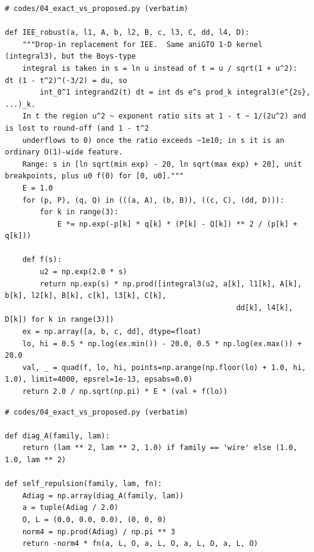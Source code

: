 \documentclass[11pt]{article}
\begin{document}
\begin{lstlisting}[caption={\textbf{Proposed}: the same integral in $s=\ln u$ with range, breakpoints and the
  analytic small-$u$ piece (eqs~\ref{n:logvar}--\ref{n:final}).},label=n:code:robust]
# codes/04_exact_vs_proposed.py (verbatim)

def IEE_robust(a, l1, A, b, l2, B, c, l3, C, dd, l4, D):
    """Drop-in replacement for IEE.  Same aniGTO 1-D kernel (integral3), but the Boys-type
    integral is taken in s = ln u instead of t = u / sqrt(1 + u^2):  dt (1 - t^2)^(-3/2) = du, so
        int_0^1 integrand2(t) dt = int ds e^s prod_k integral3(e^{2s}, ...)_k.
    In t the region u^2 ~ exponent ratio sits at 1 - t ~ 1/(2u^2) and is lost to round-off (and 1 - t^2
    underflows to 0) once the ratio exceeds ~1e10; in s it is an ordinary O(1)-wide feature.
    Range: s in [ln sqrt(min exp) - 20, ln sqrt(max exp) + 20], unit breakpoints, plus u0 f(0) for [0, u0]."""
    E = 1.0
    for (p, P), (q, Q) in (((a, A), (b, B)), ((c, C), (dd, D))):
        for k in range(3):
            E *= np.exp(-p[k] * q[k] * (P[k] - Q[k]) ** 2 / (p[k] + q[k]))

    def f(s):
        u2 = np.exp(2.0 * s)
        return np.exp(s) * np.prod([integral3(u2, a[k], l1[k], A[k], b[k], l2[k], B[k], c[k], l3[k], C[k],
                                                     dd[k], l4[k], D[k]) for k in range(3)])
    ex = np.array([a, b, c, dd], dtype=float)
    lo, hi = 0.5 * np.log(ex.min()) - 20.0, 0.5 * np.log(ex.max()) + 20.0
    val, _ = quad(f, lo, hi, points=np.arange(np.floor(lo) + 1.0, hi, 1.0), limit=4000, epsrel=1e-13, epsabs=0.0)
    return 2.0 / np.sqrt(np.pi) * E * (val + f(lo))
\end{lstlisting}

\begin{lstlisting}[caption={Exact test: $E_x=-(\phi\phi|\phi\phi)$ of the wire and sheet (eqs~\ref{n:ex} and
  \ref{n:self}); \texttt{fn} is \texttt{IEE} or \texttt{IEE\_robust}.},label=n:code:test]
# codes/04_exact_vs_proposed.py (verbatim)

def diag_A(family, lam):
    return (lam ** 2, lam ** 2, 1.0) if family == 'wire' else (1.0, 1.0, lam ** 2)

def self_repulsion(family, lam, fn):
    Adiag = np.array(diag_A(family, lam))
    a = tuple(Adiag / 2.0)
    O, L = (0.0, 0.0, 0.0), (0, 0, 0)
    norm4 = np.prod(Adiag) / np.pi ** 3
    return -norm4 * fn(a, L, O, a, L, O, a, L, O, a, L, O)
\end{lstlisting}
\end{document}
